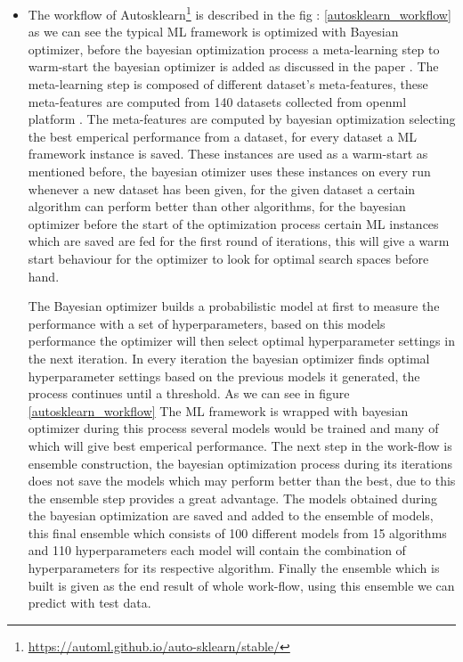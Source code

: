 \begin{itemize}
    \begin{itemize}
        \item The workflow of Autosklearn\footnote{\url{https://automl.github.io/auto-sklearn/stable/}} is described in the fig : \ref{autosklearn_workflow} as we can see the typical ML framework is optimized with Bayesian optimizer, before the bayesian optimization process a meta-learning step to warm-start the bayesian optimizer is added as discussed in the paper \cite{autosklearn}. The meta-learning step is composed of different dataset's meta-features, these meta-features are computed from 140 datasets collected from openml platform \cite{OpenML2013}. The meta-features are computed by bayesian optimization selecting the best emperical performance from a dataset, for every dataset a ML framework instance is saved. These instances are used as a warm-start as mentioned before, the bayesian otimizer uses these instances on every run whenever a new dataset has been given, for the given dataset a certain algorithm can perform better than other algorithms, for the bayesian optimizer before the start of the optimization process certain ML instances which are saved are fed for the first round of iterations, this will give a warm start behaviour for the optimizer to look for optimal search spaces before hand.
        
        The Bayesian optimizer builds a probabilistic model at first to measure the performance with a set of hyperparameters, based on this models performance the optimizer will then select optimal hyperparameter settings in the next iteration\cite{autosklearn}. In every iteration the bayesian  optimizer finds optimal hyperparameter settings based on the previous models it generated, the process continues until a threshold.
        As we can see in figure \ref{autosklearn_workflow} The ML framework is wrapped with bayesian optimizer during this process several models would be trained and many of which will give best emperical performance. The next step in the work-flow is ensemble construction, the bayesian optimization process during its iterations does not save the models which may perform better than the best, due to this the ensemble step provides a great advantage. The models obtained during the bayesian optimization are saved and added to the ensemble of models, this final ensemble which consists of 100 different models from 15 algorithms and 110 hyperparameters\cite{autosklearn} each model will contain the combination of hyperparameters for its respective algorithm.
        Finally the ensemble which is built is given as the end result of whole work-flow, using this ensemble we can predict with test data.
    \end{itemize}
    

\end{itemize}
